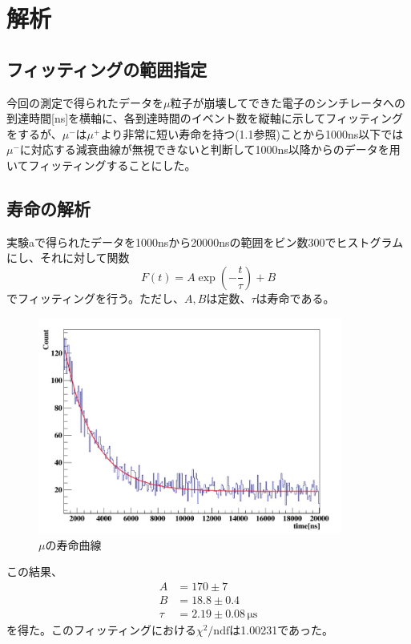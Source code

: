 \section{解析}
\subsection{フィッティングの範囲指定}
今回の測定で得られたデータを$\mu$粒子が崩壊してできた電子のシンチレータへの到達時間[ns]を‎横軸に、各到達時間のイベント数を縦軸に示してフィッティングをするが、$\mu^-$は$\mu^+$より非常に短い寿命を持つ(1.1参照)ことから1000ns以下では$\mu^-$に対応する減衰曲線が無視できないと判断して1000ns以降からのデータを用いてフィッティングすることにした。

\subsection{寿命の解析}
実験aで得られたデータを1000nsから20000nsの範囲をビン数300でヒストグラムにし、それに対して関数
\begin{equation}
F(t)=A\exp\left(-\frac{t}{\tau}\right)+B
\end{equation}
でフィッティングを行う。ただし、$A,B$は定数、$\tau$は寿命である。
\begin{figure}[htbp]
  \centering
  \includegraphics[width=10cm,bb=0 0 919 656]{lifetime.jpg}
  \caption{$\mu$の寿命曲線}
  \label{実験aのフィッティング}
\end{figure}

この結果、
\begin{align}
A &= 170 \pm 7  \\
B &= 18.8 \pm 0.4 \\
\tau &= 2.19 \pm 0.08\,\mathrm{\mu s}
\end{align}
を得た。このフィッティングにおける$\chi^2/\mathrm{ndf}$は1.00231であった。

